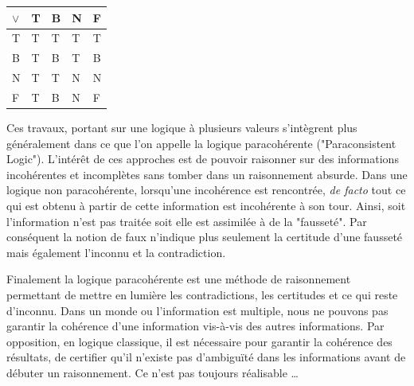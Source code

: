 \begin{refsegment}
\begin{table}[H]
\begin{subtable}{0.35\linewidth}
        \end{subtable}
        \begin{subtable}{0.35\linewidth}
            \centering
            \begin{tabular}{|>{\columncolor{LightCyan}}l|l|l|l|l|}
                \toprule
                \rowcolor{LightCyan}
                $\lor$ & T & B & N & F \\
                \midrule
                T       & T & T & T & T \\ \hline
                B       & T & B & T & B \\ \hline
                N       & T & T & N & N \\ \hline
                F       & T & B & N & F\\
                \bottomrule
            \end{tabular}
        \end{subtable}
    \end{table}

    Ces travaux, portant sur une logique à plusieurs valeurs s'intègrent plus généralement dans ce que l'on appelle la logique paracohérente ("Paraconsistent Logic"). L'intérêt de ces approches est de pouvoir raisonner sur des informations incohérentes et incomplètes sans tomber dans un raisonnement absurde. Dans une logique non paracohérente, lorsqu'une incohérence est rencontrée, \textit{de facto} tout ce qui est obtenu à partir de cette information est incohérente à son tour. Ainsi, soit l'information n'est pas traitée soit elle est assimilée à de la "fausseté". Par conséquent la notion de faux n'indique plus seulement la certitude d'une fausseté mais également l'inconnu et la contradiction.
    
    Finalement la logique paracohérente est une méthode de raisonnement permettant de mettre en lumière les contradictions, les certitudes et ce qui reste d'inconnu. Dans un monde ou l'information est multiple, nous ne pouvons pas garantir la cohérence d'une information vis-à-vis des autres informations. Par opposition, en logique classique, il est nécessaire pour garantir la cohérence des résultats, de certifier qu'il n'existe pas d'ambiguïté dans les informations avant de débuter un raisonnement. Ce n'est pas toujours réalisable \ldots
    

\end{refsegment}
